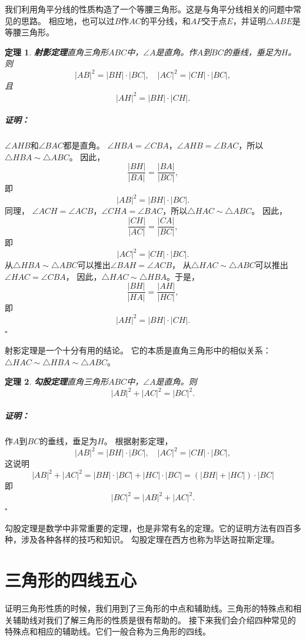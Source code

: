 \documentclass[12pt,UTF8]{ctexbook}
\newtheorem{tm}{定理}[section]
\newenvironment{proof2}{\paragraph{\textbf{证明：}}}{\hfill$\square$}
\begin{document}
我们利用角平分线的性质构造了一个等腰三角形。这是与角平分线相关的问题中常见的思路。
相应地，也可以过$B$作$AC$的平分线，和$AP$交于点$E$，并证明$\triangle ABE$是等腰三角形。

\begin{tm}{\textbf{射影定理}}\label{tm:0-2-2}
    直角三角形$ABC$中，$\angle A$是直角。作$A$到$BC$的垂线，垂足为$H$。则
    $$ |AB|^2 = |BH|\cdot |BC|, \quad |AC|^2 = |CH|\cdot |BC|,$$
    且
    $$|AH|^2 = |BH| \cdot |CH|.$$
\end{tm}
\begin{proof2}
    $\angle AHB$和$\angle BAC$都是直角。
    $\angle HBA = \angle CBA$，$\angle AHB = \angle BAC$，所以$\triangle HBA \sim \triangle ABC$。
    因此，
    $$ \frac{|BH|}{|BA|} = \frac{|BA|}{|BC|},$$
    即
    $$ |AB|^2 = |BH|\cdot |BC|.$$
    同理，
    $\angle ACH = \angle ACB$，$\angle CHA = \angle BAC$，所以$\triangle HAC \sim \triangle ABC$。
    因此，
    $$ \frac{|CH|}{|AC|} = \frac{|CA|}{|BC|},$$
    即
    $$ |AC|^2 = |CH|\cdot |BC|.$$
    从$\triangle HBA \sim \triangle ABC$可以推出$\angle BAH = \angle ACB$，
    从$\triangle HAC \sim \triangle ABC$可以推出$\angle HAC = \angle CBA$，
    因此，$\triangle HAC \sim \triangle HBA$。于是，
    $$ \frac{|BH|}{|HA|} = \frac{|AH|}{|HC|},$$
    即
    $$|AH|^2 = |BH| \cdot |CH|.$$
\end{proof2}

射影定理是一个十分有用的结论。
它的本质是直角三角形中的相似关系：$\triangle HAC \sim \triangle HBA \sim \triangle ABC$。

\begin{tm}{\textbf{勾股定理}}\label{tm:0-2-3}
    直角三角形$ABC$中，$\angle A$是直角。则
    $$|AB|^2+|AC|^2 = |BC|^2.$$
\end{tm}
\begin{proof2}
    作$A$到$BC$的垂线，垂足为$H$。
    根据射影定理，    
    $$ |AB|^2 = |BH|\cdot |BC|, \quad |AC|^2 = |CH|\cdot |BC|,$$
    这说明
    $$ |AB|^2+|AC|^2 = |BH|\cdot |BC| + |HC|\cdot |BC| = (|BH| + |HC|)\cdot |BC|$$
    即
    $$ |BC|^2 = |AB|^2+|AC|^2.$$
\end{proof2}

勾股定理是数学中非常重要的定理，也是非常有名的定理。它的证明方法有四百多种，涉及各种各样的技巧和知识。
勾股定理在西方也称为毕达哥拉斯定理。

\chapter{三角形的四线五心}
证明三角形性质的时候，我们用到了三角形的中点和辅助线。三角形的特殊点和相关辅助线对我们了解三角形的性质是很有帮助的。
接下来我们会介绍四种常见的特殊点和相应的辅助线。它们一般合称为三角形的四线。
\end{document}
